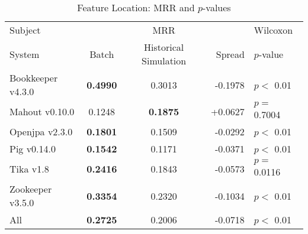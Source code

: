 \begin{table}[t]
\centering
\caption{Feature Location: MRR and $p$-values}
\begin{tabular}{l|ccr|l}
\toprule
Subject & & MRR & & Wilcoxon  \\
System  &  Batch & Historical Simulation & Spread & $p$-value  \\
\midrule
Bookkeeper v4.3.0 & {\bf 0.4990 } & 0.3013 & -0.1978 & $p < $ 0.01 \\
Mahout v0.10.0 & 0.1248 & {\bf 0.1875 } & +0.0627 & $p = $ 0.7004 \\
Openjpa v2.3.0 & {\bf 0.1801 } & 0.1509 & -0.0292 & $p < $ 0.01 \\
Pig v0.14.0 & {\bf 0.1542 } & 0.1171 & -0.0371 & $p < $ 0.01 \\
Tika v1.8 & {\bf 0.2416 } & 0.1843 & -0.0573 & $p = $ 0.0116 \\
Zookeeper v3.5.0 & {\bf 0.3354 } & 0.2320 & -0.1034 & $p < $ 0.01 \\
\midrule
All & {\bf 0.2725 } & 0.2006 & -0.0718 & $p < $ 0.01 \\
\bottomrule
\end{tabular}
\label{table:feature_location_rq2}
\end{table}
